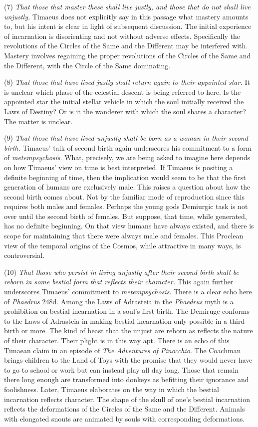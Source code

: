 (7) \emph{That those that master these shall live justly, and those that do not shall live unjustly.} Timaeus does not explicitly say in this passage what mastery amounts to, but his intent is clear in light of subsequent discussion. The initial experience of incarnation is disorienting and not without adverse effects. Specifically the revolutions of the Circles of the Same and the Different may be interfered with. Mastery involves regaining the proper revolutions of the Circles of the Same and the Different, with the Circle of the Same dominating. 

(8) \emph{That those that have lived justly shall return again to their appointed star.} It is unclear which phase of the celestial descent is being referred to here. Is the appointed star the initial stellar vehicle in which the soul initially received the Laws of Destiny? Or is it the wanderer with which the soul shares a character? The matter is unclear.

(9) \emph{That those that have lived unjustly shall be born as a woman in their second birth.} Timaeus' talk of second birth again underscores his commitment to a form of \emph{metempsychosis}. What, precisely, we are being asked to imagine here depends on how Timaeus' view on time is best interpreted. If Timaeus is positing a definite beginning of time, then the implication would seem to be that the first generation of humans are exclusively male. This raises a question about how the second birth comes about. Not by the familiar mode of reproduction since this requires both males and females. Perhaps the young gods Demiurgic task is not over until the second birth of females. But suppose, that time, while generated, has no definite beginning. On that view humans have always existed, and there is scope for maintaining that there were always male and females. This Proclean view of the temporal origins of the Cosmos, while attractive in many ways, is controversial.

(10) \emph{That those who persist in living unjustly after their second birth shall be reborn in some bestial form that reflects their character.} This again further underscores Timaeus' commitment to \emph{metempsychosis}. There is a clear echo here of \emph{Phaedrus} 248d. Among the Laws of Adrasteia in the \emph{Phaedrus} myth is a prohibition on bestial incarnation in a soul's first birth. The Demiruge conforms to the Laws of Adrasteia in making bestial incarnation only possible in a third birth or more. The kind of beast that the unjust are reborn as reflects the nature of their character. Their plight is in this way apt. There is an echo of this Timaean claim in an episode of \emph{The Adventures of Pinocchio}. The Coachman brings children to the Land of Toys with the promise that they would never have to go to school or work but can instead play all day long. Those that remain there long enough are transformed into donkeys as befitting their ignorance and foolishness. Later, Timaeus elaborates on the way in which the bestial incarnation reflects character. The shape of the skull of one's bestial incarnation reflects the deformations of the Circles of the Same and the Different. Animals with elongated snouts are animated by souls with corresponding deformations. 

